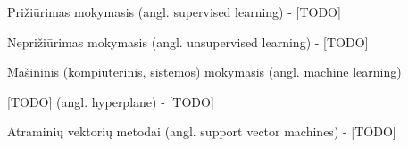 Prižiūrimas mokymasis (angl. supervised learning) - [TODO]

Neprižiūrimas mokymasis (angl. unsupervised learning) - [TODO]

Mašininis\cite{mamcenko08} (kompiuterinis, sistemos\cite{martisiute08})
mokymasis (angl. machine learning)

[TODO] (angl. hyperplane) - [TODO]

Atraminių vektorių metodai (angl. support vector machines) - [TODO]